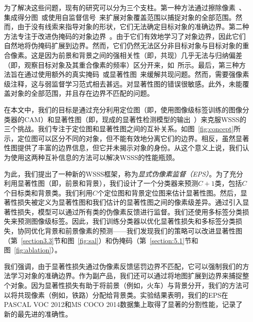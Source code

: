 \documentclass[final]{cvpr}
\begin{document}


为了解决这些问题，现有的研究可以分为三个支柱。第一种方法通过擦除像素~\cite{choe2020attention,kim2017two, li2018tell}、集成得分图~\cite{jiang2019integral, lee2019ficklenet}或使用自监督信号~\cite{wang2020self}来扩展对象覆盖范围以捕捉对象的全部范围。然而，由于没有线索来指导对象的形状，它们无法确定目标对象的准确边界。第二种方法专注于改进伪掩码的对象边界~\cite{fan2020learning,chen2020boundary}。由于它们有效地学习了对象边界，因此它们自然地将伪掩码扩展到边界。然而，它们仍然无法区分非目标对象与目标对象的重合像素。这是因为前景和背景之间的强相关性（即，共现）几乎无法与归纳偏差（即，观察目标对象及其重合像素的频率）区分开来，如~\cite{choe2020evaluating}所示。最后，第三种方法旨在通过使用额外的真实掩码~\cite{BMVC2016_92}或显著性图~\cite{oh2017exploiting, yao2020saliency}来缓解共现问题。然而，\cite{BMVC2016_92,li2018tell}需要强像素级注释，这与弱监督学习范式相去甚远。\cite{oh2017exploiting}对显著性图的错误很敏感。此外，\cite{yao2020saliency}未能覆盖对象的全部范围，并且存在边界不匹配的问题。

在本文中，我们的目标是通过充分利用定位图（即，使用图像级标签训练的图像分类器的CAM）和显著性图（即，现成的显著性检测模型的输出~\cite{hou2017deeply,nguyen2019deepusps,zhao2019pyramid}）来克服WSSS的三个挑战。我们专注于定位图和显著性图之间的互补关系。如图~\ref{fig:concept}所示，定位图可以区分不同的对象，但不能有效地分离它们的边界。相反，虽然显著性图提供了丰富的边界信息，但它并未揭示对象的身份。从这个意义上说，我们认为使用这两种互补信息的方法可以解决WSSS的性能瓶颈。

为此，我们提出了一种新的WSSS框架，称为\emph{显式伪像素监督（EPS）}。为了充分利用显著性图（即，前景和背景），我们设计了一个分类器来预测$C+1$类，包括$C$个目标类和背景类。我们利用$C$个定位图和背景定位图来估计显著性图。然后，显著性损失被定义为显著性图和我们估计的显著性图之间的像素级差异。通过引入显著性损失，模型可以通过所有类的伪像素反馈进行监督。我们还使用多标签分类损失来预测图像级标签。因此，我们训练分类器以优化显著性损失和多标签分类损失，协同优化背景和前景像素的预测——我们发现我们的策略可以改进显著性图（第~\ref{section3.3}节和图~\ref{fig:sal}）和伪掩码（第~\ref{section:5.1}节和图~\ref{fig:ablation}）。

我们强调，由于显著性损失通过伪像素反馈惩罚边界不匹配，它可以强制我们的方法学习对象的准确边界。作为副产品，我们还可以通过将地图扩展到边界来捕捉整个对象。因为显著性损失有助于将前景（例如，火车）与背景分开，我们的方法可以将共现像素（例如，铁路）分配给背景类。实验结果表明，我们的EPS在PASCAL VOC 2012和MS COCO 2014数据集上取得了显著的分割性能，记录了新的最先进的准确性。
\end{document}
